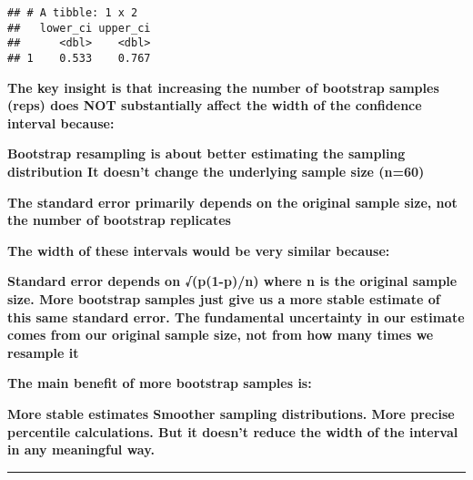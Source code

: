 \documentclass[
]{article}
\begin{document}
\begin{verbatim}
## # A tibble: 1 x 2
##   lower_ci upper_ci
##      <dbl>    <dbl>
## 1    0.533    0.767
\end{verbatim}

\textbf{The key insight is that increasing the number of bootstrap
samples (reps) does NOT substantially affect the width of the confidence
interval because:}

\textbf{Bootstrap resampling is about better estimating the sampling
distribution It doesn't change the underlying sample size (n=60)}

\textbf{The standard error primarily depends on the original sample
size, not the number of bootstrap replicates}

\textbf{The width of these intervals would be very similar because:}

\textbf{Standard error depends on √(p(1-p)/n) where n is the original
sample size. More bootstrap samples just give us a more stable estimate
of this same standard error. The fundamental uncertainty in our estimate
comes from our original sample size, not from how many times we resample
it}

\textbf{The main benefit of more bootstrap samples is:}

\textbf{More stable estimates Smoother sampling distributions. More
precise percentile calculations. But it doesn't reduce the width of the
interval in any meaningful way.}

\begin{center}\rule{0.5\linewidth}{0.5pt}\end{center}
\end{document}
